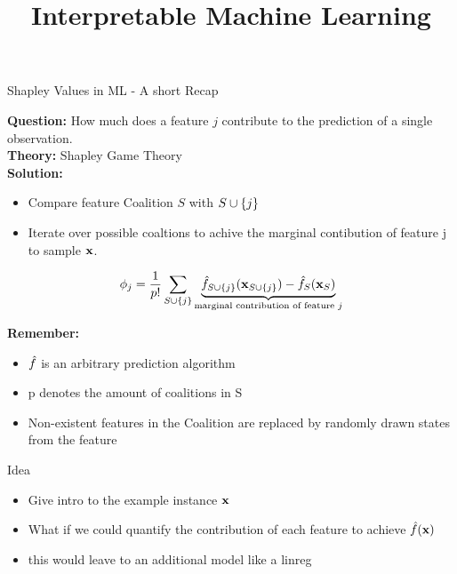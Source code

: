 \documentclass[11pt,compress,t,notes=noshow, aspectratio=169, xcolor=table]{beamer}
\title{Interpretable Machine Learning}
\date{}
\begin{document}
\newcommand{\titlefigure}{figure_man/molnar-shapplot.png}
\newcommand{\learninggoals}{
\item Get an intuition of additive feature attributions
\item Understand the concept of Kernel SHAP
\item Ability to interpret SHAP plots
\item Global SHAP methods
}



\begin{vbframe}{Shapley Values in ML - A short Recap}
  
  \textbf{Question:} How much does a feature $j$ contribute to the prediction of a single observation. \\
  \textbf{Theory:} Shapley Game Theory \\
  \textbf{Solution:} 
  \begin{itemize}
    \item Compare feature Coalition $S$ with $S \cup \{j\}$ 
    \item Iterate over possible coaltions to achive the marginal contibution of feature j to sample $\mathbf{x}$. 
\end{itemize}

     $$ \phi_j  = \frac{1}{p!} \sum_{S \cup \{j\}} \underbrace{\hat{f}_{S \cup \{j\}}(\mathbf{x}_{S \cup \{j\}}) - \hat{f}_{S}(\mathbf{x}_{S})}_{\text{marginal contribution of feature $j$}} $$

\textbf{Remember:}

\begin{itemize}
    \item $\hat{f}$ is an arbitrary prediction algorithm
    \item p denotes the amount of coalitions in S
    \item Non-existent features in the Coalition are replaced by randomly drawn states from the feature
\end{itemize}

\end{vbframe}

\begin{vbframe}{Idea}

\begin{itemize}
    \item Give intro to the example instance $\mathbf{x}$
    \item What if we could quantify the contribution of each feature to achieve $\hat{f}(\mathbf{x})$
    \item this would leave to an additional model like a linreg
\end{itemize}


\end{vbframe}
\end{document}
